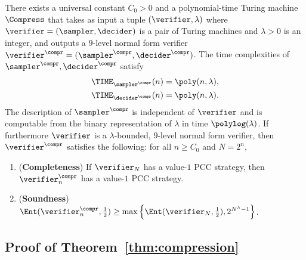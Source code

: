 \begin{theorem}
  \label{thm:compression}
  There exists a universal constant $C_0 > 0$ and a polynomial-time Turing machine $\Compress$ that takes as input a
  tuple $(\verifier, \lambda)$ where $\verifier = (\sampler,\decider)$ is a pair of Turing machines and $\lambda > 0$ is an integer, and outputs a $9$-level normal form verifier $\verifier^\compr = (\sampler^\compr,\decider^\compr)$.
  The time complexities of $\sampler^\compr,\decider^\compr$ satisfy
  \begin{equation*}
    \begin{split}
      \TIME_{\sampler^\compr}(n) & = \poly (n, \lambda),\\
      \TIME_{\decider^\compr}(n) & = \poly (n, \lambda).
    \end{split}
  \end{equation*}
  The description of $\sampler^\compr$ is independent of $\verifier$ and is
  computable from the binary representation of $\lambda$ in time $\polylog
  (\lambda)$.	
  If furthermore $\verifier$ is a $\lambda$-bounded, $9$-level normal form verifier, then 
  $\verifier^\compr$ satisfies the following: for all $n \geq C_0$ and $N = 2^n$,


\begin{enumerate}
  \item \label{enu:compr-completeness} (\textbf{Completeness}) If $\verifier_{N}$
    has a value-$1$ PCC strategy, then $\verifier^\compr_n$ has a value-$1$ PCC
    strategy.
\item \label{enu:compr-soundness} (\textbf{Soundness})
    $\Ent(\verifier_{n}^\compr,\frac{1}{2}) \geq \max \left \{
      \Ent(\verifier_{N}, \frac{1}{2}), 2^{N^{\lambda}-1}
    \right \}$.
  \end{enumerate}
\end{theorem}

\subsection{Proof of Theorem~\ref{thm:compression}}

